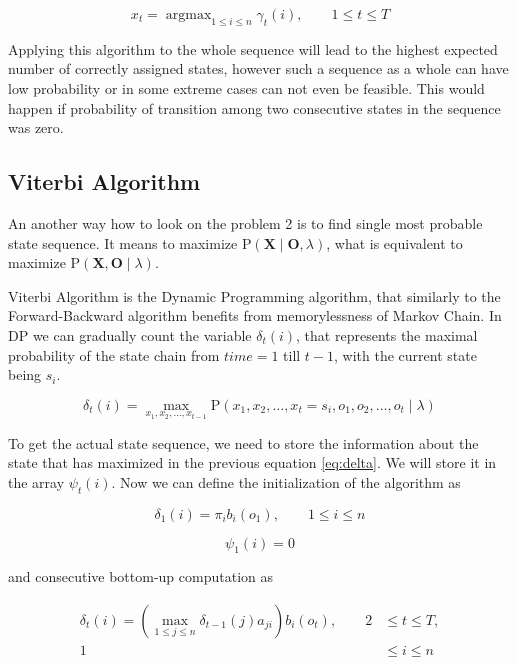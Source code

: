 \documentclass[thesis=M,english]{FITthesis}[2012/10/20]
\newcommand{\matr}[1]{\mathbf{#1}}
\newcommand{\argmax}{\mathop{\mathrm{argmax}}}
\begin{document}
\begin{equation}
x_t = \argmax_{1 \leq i \leq n} \gamma_t(i), \qquad 1 \leq t \leq T
\end{equation} 

Applying this algorithm to the whole sequence will lead to the highest expected number of correctly assigned states, however such a sequence as a whole can have low probability or in some extreme cases can not even be feasible. This would happen if probability of transition among two consecutive states in the sequence was zero.   
   
\subsection{Viterbi Algorithm} 

An another way how to look on the problem 2 is to find single most probable state sequence. It means to maximize $\mathrm{P}(\matr{X}\mid \matr{O},\lambda)$, what is equivalent to maximize $\mathrm{P}(\matr{X}, \matr{O}\mid\lambda)$. %

Viterbi Algorithm is the Dynamic Programming algorithm, that similarly to the Forward-Backward algorithm  benefits from memorylessness of Markov Chain. In DP we can gradually count the variable $\delta_t(i)$, that represents the maximal probability of the state chain from $time = 1$ till $t-1$, with the current state being $s_i$.

\begin{equation}\label{eq:delta}
\delta_t(i) = \max_{x_1,x_2,\dots,x_{t-1}} \mathrm{P}( x_1,x_2,\dots, x_t = s_i, o_1, o_2, \dots, o_t \mid \lambda )
\end{equation} %

To get the actual state sequence, we need to store the information about the state that has maximized in the previous equation \eqref{eq:delta}. We will store it in the array $\psi_t(i)$. Now we can define the initialization of the algorithm as

\begin{equation}
\delta_1(i) = \pi_i b_i(o_1), \qquad 1 \leq i \leq n 
\end{equation}

\begin{equation}
\psi_1(i) = 0 
\end{equation}

and consecutive bottom-up computation as

\begin{equation}
\begin{aligned}
\delta_{t}(i) = ( \max_{ 1 \leq j \leq n } \delta_{t-1}(j)a_{ji} ) b_i(o_{t}), \qquad 2& \leq t \leq T, \\
																					   1& \leq i \leq n
\end{aligned}
\end{equation}
\end{document}
